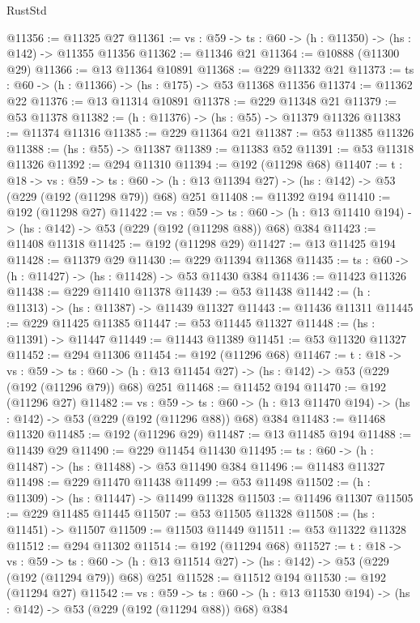 \begin{lexlean}{RustStd}
\begin{coremodule}
@11356 := @11325 @27
@11361 := {vs : @59} -> {ts : @60} -> (h : @11350) -> (hs : @142) -> @11355 @11356
@11362 := @11346 @21
@11364 := @10888 (@11300 @29)
@11366 := @13 @11364 @10891
@11368 := @229 @11332 @21
@11373 := {ts : @60} -> (h : @11366) -> (hs : @175) -> @53 @11368 @11356
@11374 := @11362 @22
@11376 := @13 @11314 @10891
@11378 := @229 @11348 @21
@11379 := @53 @11378
@11382 := (h : @11376) -> (hs : @55) -> @11379 @11326
@11383 := @11374 @11316
@11385 := @229 @11364 @21
@11387 := @53 @11385 @11326
@11388 := (hs : @55) -> @11387
@11389 := @11383 @52
@11391 := @53 @11318 @11326
@11392 := @294 @11310
@11394 := @192 (@11298 @68)
@11407 := {t : @18} ->
  {vs : @59} ->
  {ts : @60} -> (h : @13 @11394 @27) -> (hs : @142) -> @53 (@229 (@192 (@11298 @79)) @68) @251
@11408 := @11392 @194
@11410 := @192 (@11298 @27)
@11422 := {vs : @59} ->
  {ts : @60} -> (h : @13 @11410 @194) -> (hs : @142) -> @53 (@229 (@192 (@11298 @88)) @68) @384
@11423 := @11408 @11318
@11425 := @192 (@11298 @29)
@11427 := @13 @11425 @194
@11428 := @11379 @29
@11430 := @229 @11394 @11368
@11435 := {ts : @60} -> (h : @11427) -> (hs : @11428) -> @53 @11430 @384
@11436 := @11423 @11326
@11438 := @229 @11410 @11378
@11439 := @53 @11438
@11442 := (h : @11313) -> (hs : @11387) -> @11439 @11327
@11443 := @11436 @11311
@11445 := @229 @11425 @11385
@11447 := @53 @11445 @11327
@11448 := (hs : @11391) -> @11447
@11449 := @11443 @11389
@11451 := @53 @11320 @11327
@11452 := @294 @11306
@11454 := @192 (@11296 @68)
@11467 := {t : @18} ->
  {vs : @59} ->
  {ts : @60} -> (h : @13 @11454 @27) -> (hs : @142) -> @53 (@229 (@192 (@11296 @79)) @68) @251
@11468 := @11452 @194
@11470 := @192 (@11296 @27)
@11482 := {vs : @59} ->
  {ts : @60} -> (h : @13 @11470 @194) -> (hs : @142) -> @53 (@229 (@192 (@11296 @88)) @68) @384
@11483 := @11468 @11320
@11485 := @192 (@11296 @29)
@11487 := @13 @11485 @194
@11488 := @11439 @29
@11490 := @229 @11454 @11430
@11495 := {ts : @60} -> (h : @11487) -> (hs : @11488) -> @53 @11490 @384
@11496 := @11483 @11327
@11498 := @229 @11470 @11438
@11499 := @53 @11498
@11502 := (h : @11309) -> (hs : @11447) -> @11499 @11328
@11503 := @11496 @11307
@11505 := @229 @11485 @11445
@11507 := @53 @11505 @11328
@11508 := (hs : @11451) -> @11507
@11509 := @11503 @11449
@11511 := @53 @11322 @11328
@11512 := @294 @11302
@11514 := @192 (@11294 @68)
@11527 := {t : @18} ->
  {vs : @59} ->
  {ts : @60} -> (h : @13 @11514 @27) -> (hs : @142) -> @53 (@229 (@192 (@11294 @79)) @68) @251
@11528 := @11512 @194
@11530 := @192 (@11294 @27)
@11542 := {vs : @59} ->
  {ts : @60} -> (h : @13 @11530 @194) -> (hs : @142) -> @53 (@229 (@192 (@11294 @88)) @68) @384

\end{coremodule}
\end{lexlean}

